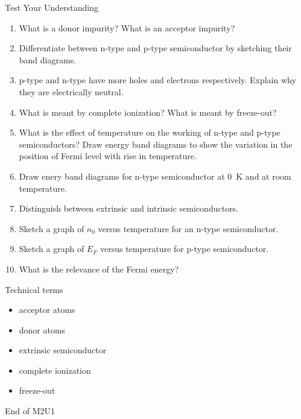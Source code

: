 \begin{frame}[label=pre-M2T1-slot2]{Test Your Understanding}
	\begin{enumerate}
		\item What is a donor impurity? What is an acceptor impurity?
		\item Differentiate between n-type and p-type semiconductor by sketching their band diagrams.
		\item p-type and n-type have more holes and electrons respectively.	Explain why they are electrically neutral.
		\item What is meant by complete ionization? What is meant by freeze-out?
		\item What is the effect of temperature on the working of n-type and p-type semiconductors? Draw energy band diagrams to show the variation in the position of Fermi level with rise in temperature.
		\item Draw enery band diagrams for n-type semiconductor at \SI{0}{\kelvin} and at room temperature.
		\item Distinguish between extrinsic and intrinsic semiconductors.
		\item Sketch a graph of \(n_0\) versus temperature for an n-type semiconductor.
		\item Sketch a graph of \(E_F\) versus temperature for p-type semiconductor.
		\item What is the relevance of the Fermi energy?
	\end{enumerate}
\end{frame}
%
\begin{frame}[label=pre-M2T1-slot2]{Technical terms}
	\begin{itemize}
		\item acceptor atoms
		\item donor atoms
		\item extrinsic semiconductor
		\item complete ionization
		\item freeze-out
	\end{itemize}
\end{frame}
%
\begin{frame}[label=pre-M2T1-slot2]{}
	\begin{huge}
		\begin{center}
			End of M2U1
		\end{center}
	\end{huge}
	
\end{frame}
%